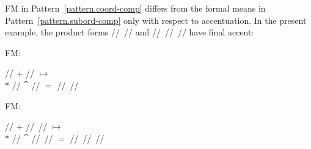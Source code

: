 \documentclass[output=paper
  ,nobabel
  ,draftmode
  ,colorlinks, citecolor=brown
]{langscibook}
\begin{document}
FM in Pattern \ref{pattern.coord-comp} differs from
the formal means in Pattern \ref{pattern.subord-comp}
only with respect to accentuation. In the present example, the product forms
// // and // // // have final accent: \begin{exe}
\ex \begin{xlist}
\ex \raggedright
\begin{labeledlist}{FM:}
\item[FM:] \raggedright // $+$ // $↦$\\*{}
// $⁀$ // $=$ // //
\end{labeledlist}
\ex \raggedright
\begin{labeledlist}{FM:}
\item[FM:] \raggedright // $+$ // // $↦$\\*{}
// $⁀$ // // $=$ // // //
\end{labeledlist}
\end{xlist}
\end{exe}
\end{document}

